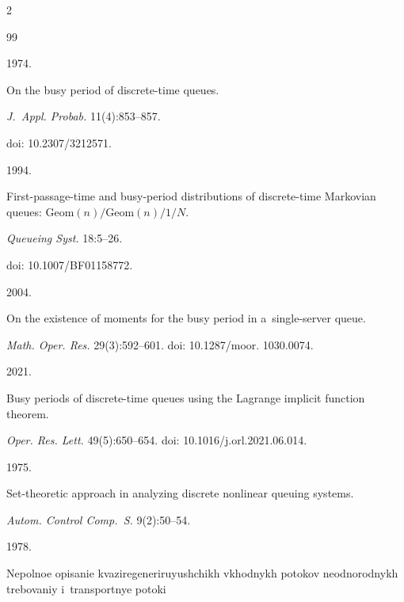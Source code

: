 \begin{multicols}{2}
{{\begin{thebibliography}{99}

 1974.

On the busy period of discrete-time queues. 

\textit{J.~Appl. Probab.} 11(4):853--857.

doi: 10.2307/3212571.





 1994.

First-passage-time and busy-period distributions of discrete-time Markovian queues: $\mathrm{Geom}(n)/\mathrm{Geom}(n)/1/N$. 

\textit{Queueing Syst.} 18:5--26. 

doi: 10.1007/BF01158772.





 2004. 

On the existence of moments for the busy period in a~single-server queue. 

\textit{Math. Oper. Res.} 29(3):592--601. doi: 10.1287/moor. 1030.0074.





 2021. 

Busy periods of discrete-time queues using the Lagrange implicit function theorem. 

\textit{Oper. Res. Lett.} 49(5):650--654. doi: 10.1016/j.orl.2021.06.014.





 1975.

Set-theoretic approach in analyzing discrete nonlinear queuing systems.

\textit{Autom. Control  Comp.~S.} 9(2):50--54.

    



 1978.

Nepolnoe opisanie kva\-zi\-re\-ge\-ne\-ri\-ru\-yushchikh vkhodnykh potokov neodnorodnykh trebovaniy i~transportnye potoki 


\end{thebibliography}}}
\end{multicols}
